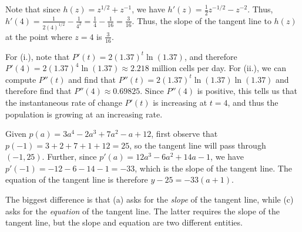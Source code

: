 \begin{activitySolution}
\ba
	  \item Note that since $h(z) = z^{1/2} + z^{-1}$, we have $h'(z) = \frac{1}{2}z^{-1/2} - z^{-2}$.  Thus, $h'(4) = \frac{1}{2(4)^{1/2}} - \frac{1}{4^2} = \frac{1}{4} - \frac{1}{16} = \frac{3}{16}.$  Thus, the slope of the tangent line to $h(z)$ at the point where $z = 4$ is $\frac{3}{16}$.
	  \item For (i.), note that $P'(t) = 2(1.37)^t \ln(1.37)$, and therefore $P'(4) =  2(1.37)^4 \ln(1.37) \approx 2.218$ million cells per day.  For (ii.), we can compute $P''(t)$ and find that $P''(t) = 2(1.37)^t \ln(1.37) \ln(1.37)$ and therefore find that $P''(4) \approx  0.69825$.  Since $P''(4)$ is positive, this tells us that the instantaneous rate of change $P'(t)$ is increasing at $t = 4$, and thus the population is growing at an increasing rate.
	  \item Given $p(a) = 3a^4 - 2a^3 + 7a^2 - a + 12$, first observe that $p(-1) = 3 + 2 + 7 + 1 + 12 = 25$, so the tangent line will pass through $(-1,25)$.  Further, since $p'(a) = 12a^3 - 6a^2 + 14a - 1$, we have $p'(-1) = -12 - 6 - 14 - 1 = -33$, which is the slope of the tangent line.  The equation of the tangent line is therefore $y - 25 = -33(a+1)$.
	  \item The biggest difference is that (a) asks for the \emph{slope} of the tangent line, while (c) asks for the \emph{equation} of the tangent line.  The latter requires the slope of the tangent line, but the slope and equation are two different entities.
\ea
\end{activitySolution}
\aftera